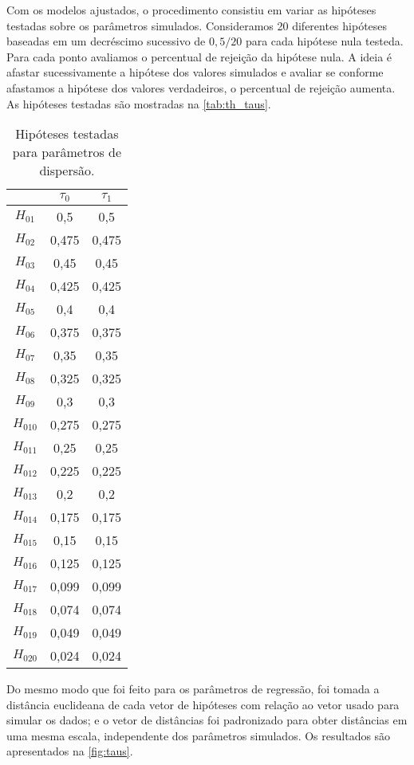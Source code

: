Com os modelos ajustados, o procedimento consistiu em variar as hipóteses testadas sobre os parâmetros simulados. Consideramos 20 diferentes hipóteses baseadas em um decréscimo sucessivo de $0,5/20$ para cada hipótese nula testeda. Para cada ponto avaliamos o percentual de rejeição da hipótese nula. A ideia é afastar sucessivamente a hipótese dos valores simulados e avaliar se conforme afastamos a hipótese dos valores verdadeiros, o percentual de rejeição aumenta. As hipóteses testadas são mostradas na \autoref{tab:th_taus}.

\begin{table}[H]
\centering
\begin{tabular}{ccc}
\hline
          & $\tau_0$ & $\tau_1$ \\ \hline
$H_{01}$  & 0,5      & 0,5      \\
$H_{02}$  & 0,475    & 0,475    \\
$H_{03}$  & 0,45     & 0,45     \\
$H_{04}$  & 0,425    & 0,425    \\
$H_{05}$  & 0,4      & 0,4      \\
$H_{06}$  & 0,375    & 0,375    \\
$H_{07}$  & 0,35     & 0,35     \\
$H_{08}$  & 0,325    & 0,325    \\
$H_{09}$  & 0,3      & 0,3      \\
$H_{010}$ & 0,275    & 0,275    \\
$H_{011}$ & 0,25     & 0,25     \\
$H_{012}$ & 0,225    & 0,225    \\
$H_{013}$ & 0,2      & 0,2      \\
$H_{014}$ & 0,175    & 0,175    \\
$H_{015}$ & 0,15     & 0,15     \\
$H_{016}$ & 0,125    & 0,125    \\
$H_{017}$ & 0,099    & 0,099    \\
$H_{018}$ & 0,074    & 0,074    \\
$H_{019}$ & 0,049    & 0,049    \\
$H_{020}$ & 0,024    & 0,024    \\ \hline
\end{tabular}
\caption{Hipóteses testadas para parâmetros de dispersão.}
\label{tab:th_taus}
\end{table}

Do mesmo modo que foi feito para os parâmetros de regressão, foi tomada a distância euclideana de cada vetor de hipóteses com relação ao vetor usado para simular os dados; e o vetor de distâncias foi padronizado para obter distâncias em uma mesma escala, independente dos parâmetros simulados. Os resultados são apresentados na \autoref{fig:taus}.

